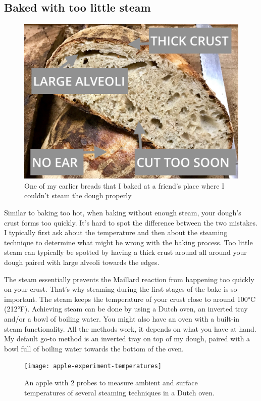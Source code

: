 \subsection{Baked with too little steam}

\begin{figure}[h]
  \includegraphics[width=\textwidth]{no-steam}
  \caption{One of my earlier breads that I baked at a friend's place where
  I couldn't steam the dough properly}
  \label{no-steam}
\end{figure}

Similar to baking too hot, when baking without enough steam, your dough's crust
forms too quickly. It's hard to spot the difference between the two mistakes.
I typically first ask about the temperature and then about the steaming technique
to determine what might be wrong with the baking process. Too little steam can
typically be spotted by having a thick crust around all around your dough paired
with large alveoli towards the edges.

The steam essentially prevents the Maillard reaction from happening too quickly
on your crust. That's why steaming during the first stages of the bake is so important.
The steam keeps the temperature of your crust close to around 100°C (212°F). Achieving steam
can be done by using a Dutch oven, an inverted tray and/or a bowl of boiling water.
You might also have an oven with a built-in steam functionality. All the methods work,
it depends on what you have at hand. My default go-to method is an inverted
tray on top of my dough, paired with a bowl full of boiling water towards the bottom
of the oven.

\begin{figure}
  \texttt{[image: apple-experiment-temperatures]}
  \caption{An apple with 2 probes to measure ambient
  and surface temperatures of several steaming techniques
  in a Dutch oven.}
  \label{apple-experiment-temperatures}
\end{figure}

